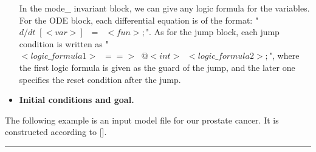 \documentclass[runningheads,a4paper]{llncs}
\begin{document}
\begin{itemize}
In the mode\_ invariant block, we can give any logic formula for the variables. For the ODE block, each differential equation is of the format: "$d/dt \; [<var>]\;\;=\;\;<fun>;$". As for the jump block, each jump condition is written as "$<logic\_formula1> \;\; ==> \;\; @<int>\;\;<logic\_formula2>;$", where the first logic formula is given as the guard of the jump, and the later one specifies the reset condition after the jump.\\

\item {\bf Initial conditions and goal.}



\end{itemize}

\begin{example}
The following example is an input model file for our prostate cancer. It is constructed according to [].\\
\noindent\rule{\textwidth}{0.7pt}


\end{example}
\end{document}

